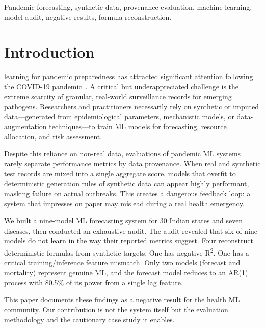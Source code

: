 \documentclass{ieeeaccess}
\begin{document}
\begin{keywords}
Pandemic forecasting, synthetic data, provenance evaluation, machine learning, model audit, negative results, formula reconstruction.
\end{keywords}

\titlepgskip=-21pt

\maketitle

\section{Introduction}
\label{sec:intro}

 learning for pandemic preparedness has attracted significant attention following the COVID-19 pandemic~\cite{wang2020,yan2023,hassan2022}. A critical but underappreciated challenge is the extreme scarcity of granular, real-world surveillance records for emerging pathogens. Researchers and practitioners necessarily rely on synthetic or imputed data---generated from epidemiological parameters, mechanistic models, or data-augmentation techniques---to train ML models for forecasting, resource allocation, and risk assessment.

Despite this reliance on non-real data, evaluations of pandemic ML systems rarely separate performance metrics by data provenance. When real and synthetic test records are mixed into a single aggregate score, models that overfit to deterministic generation rules of synthetic data can appear highly performant, masking failure on actual outbreaks. This creates a dangerous feedback loop: a system that impresses on paper may mislead during a real health emergency.

We built a nine-model ML forecasting system for 30 Indian states and seven diseases, then conducted an exhaustive audit. The audit revealed that six of nine models do not learn in the way their reported metrics suggest. Four reconstruct deterministic formulas from synthetic targets. One has negative R\textsuperscript{2}. One has a critical training/inference feature mismatch. Only two models (forecast and mortality) represent genuine ML, and the forecast model reduces to an AR(1) process with 80.5\% of its power from a single lag feature.

This paper documents these findings as a negative result for the health ML community. Our contribution is not the system itself but the evaluation methodology and the cautionary case study it enables.
\end{document}
